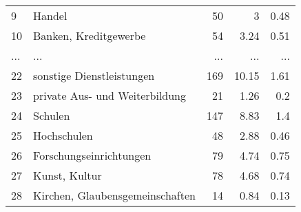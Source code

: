\begin{longtable}{lXrrr}
        9 & \multicolumn{1}{X}{Handel} & %
          \num{50} &
          \num[round-mode=places,round-precision=2]{3} &
          \num[round-mode=places,round-precision=2]{0,48} \\
        10 & \multicolumn{1}{X}{Banken, Kreditgewerbe} & %
          \num{54} &
          \num[round-mode=places,round-precision=2]{3,24} &
          \num[round-mode=places,round-precision=2]{0,51} \\
       ... & ... & ... & ... & ... \\
        22 & \multicolumn{1}{X}{sonstige Dienstleistungen} & %
          \num{169} &
          \num[round-mode=places,round-precision=2]{10,15} &
          \num[round-mode=places,round-precision=2]{1,61} \\

        23 & \multicolumn{1}{X}{private Aus- und Weiterbildung} & %
          \num{21} &
          \num[round-mode=places,round-precision=2]{1,26} &
          \num[round-mode=places,round-precision=2]{0,2} \\

        24 & \multicolumn{1}{X}{Schulen} & %
          \num{147} &
          \num[round-mode=places,round-precision=2]{8,83} &
          \num[round-mode=places,round-precision=2]{1,4} \\

        25 & \multicolumn{1}{X}{Hochschulen} & %
          \num{48} &
          \num[round-mode=places,round-precision=2]{2,88} &
          \num[round-mode=places,round-precision=2]{0,46} \\

        26 & \multicolumn{1}{X}{Forschungseinrichtungen} & %
          \num{79} &
          \num[round-mode=places,round-precision=2]{4,74} &
          \num[round-mode=places,round-precision=2]{0,75} \\

        27 & \multicolumn{1}{X}{Kunst, Kultur} & %
          \num{78} &
          \num[round-mode=places,round-precision=2]{4,68} &
          \num[round-mode=places,round-precision=2]{0,74} \\

        28 & \multicolumn{1}{X}{Kirchen, Glaubensgemeinschaften} & %
          \num{14} &
          \num[round-mode=places,round-precision=2]{0,84} &
          \num[round-mode=places,round-precision=2]{0,13} \\


\end{longtable}
